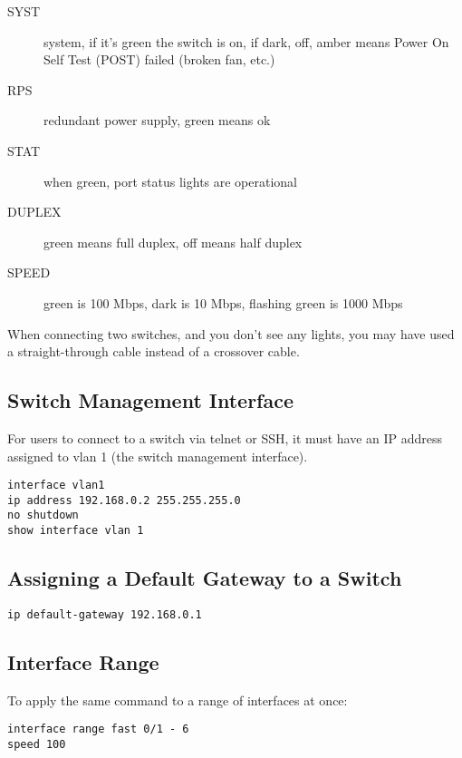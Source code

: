 \begin{description}

\item[SYST]
system, if it's green the switch is on, if dark, off, amber means
Power On Self Test (POST) failed (broken fan, etc.)

\item[RPS]
redundant power supply, green means ok

\item[STAT]
when green, port status lights are operational

\item[DUPLEX]
green means full duplex, off means half duplex

\item[SPEED]
green is 100 Mbps, dark is 10 Mbps, flashing green is 1000 Mbps

\end{description}

When connecting two switches, and you don't see any lights, you may have used
a straight-through cable instead of a crossover cable.

\subsection{Switch Management Interface}

For users to connect to a switch via telnet or SSH, it must have an IP address
assigned to vlan 1 (the switch management interface).

\begin{verbatim}
interface vlan1
ip address 192.168.0.2 255.255.255.0
no shutdown
show interface vlan 1
\end{verbatim}

\subsection{Assigning a Default Gateway to a Switch}

\begin{verbatim}
ip default-gateway 192.168.0.1
\end{verbatim}

\subsection{Interface Range}

To apply the same command to a range of interfaces at once:

\begin{verbatim}
interface range fast 0/1 - 6
speed 100
\end{verbatim}

